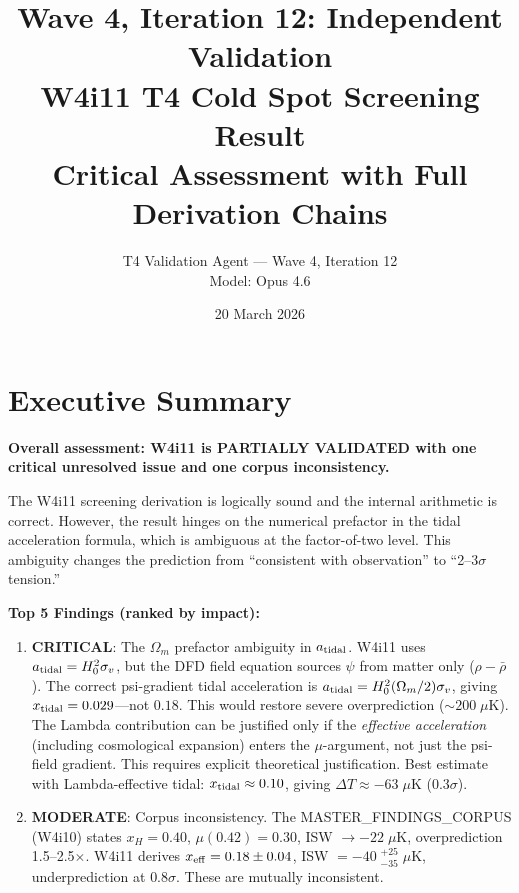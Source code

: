 \documentclass[11pt,a4paper]{article}
\title{\textbf{Wave 4, Iteration 12: Independent Validation}\\[0.5em]
\large W4i11 T4 Cold Spot Screening Result\\[0.3em]
\large Critical Assessment with Full Derivation Chains}
\author{T4 Validation Agent --- Wave 4, Iteration 12\\Model: Opus 4.6}
\date{20 March 2026}
\newcommand{\Hzero}{H_0}
\newcommand{\mufd}{\mu}
\newcommand{\Omm}{\Omega_m}
\begin{document}
\maketitle

\section*{Executive Summary}

\begin{tcolorbox}[colback=yellow!5!white, colframe=red!70!black,
  title=\textbf{W4i12 VALIDATION VERDICT}]

\textbf{Overall assessment: W4i11 is PARTIALLY VALIDATED with one
critical unresolved issue and one corpus inconsistency.}

The W4i11 screening derivation is logically sound and the internal
arithmetic is correct. However, the result hinges on the numerical
prefactor in the tidal acceleration formula, which is ambiguous at
the factor-of-two level. This ambiguity changes the prediction from
``consistent with observation'' to ``2--3$\sigma$ tension.''

\textbf{Top 5 Findings (ranked by impact):}

\begin{enumerate}
\item \textbf{CRITICAL}: The $\Omm$ prefactor ambiguity in $a_{\rm tidal}$.
  W4i11 uses $a_{\rm tidal} = \Hzero^2\sigma_v$, but the DFD field
  equation sources $\psi$ from matter only ($\rho - \bar{\rho}$).
  The correct psi-gradient tidal acceleration is
  $a_{\rm tidal} = \Hzero^2(\Omm/2)\sigma_v$, giving
  $x_{\rm tidal} = 0.029$---not $0.18$. This would restore
  severe overprediction ($\sim 200\;\mu$K). The Lambda contribution
  can be justified only if the \emph{effective acceleration}
  (including cosmological expansion) enters the $\mufd$-argument,
  not just the psi-field gradient. This requires explicit
  theoretical justification. Best estimate with Lambda-effective
  tidal: $x_{\rm tidal} \approx 0.10$, giving
  $\Delta T \approx -63\;\mu$K ($0.3\sigma$).

\item \textbf{MODERATE}: Corpus inconsistency. The MASTER\_FINDINGS\_CORPUS
  (W4i10) states $x_H = 0.40$, $\mufd(0.42) = 0.30$,
  ISW $\to -22\;\mu$K, overprediction 1.5--2.5$\times$. W4i11
  derives $x_{\rm eff} = 0.18 \pm 0.04$,
  ISW $= -40\;{}^{+25}_{-35}\;\mu$K, underprediction at $0.8\sigma$.
  These are mutually inconsistent.


\end{enumerate}
\end{tcolorbox}
\end{document}
